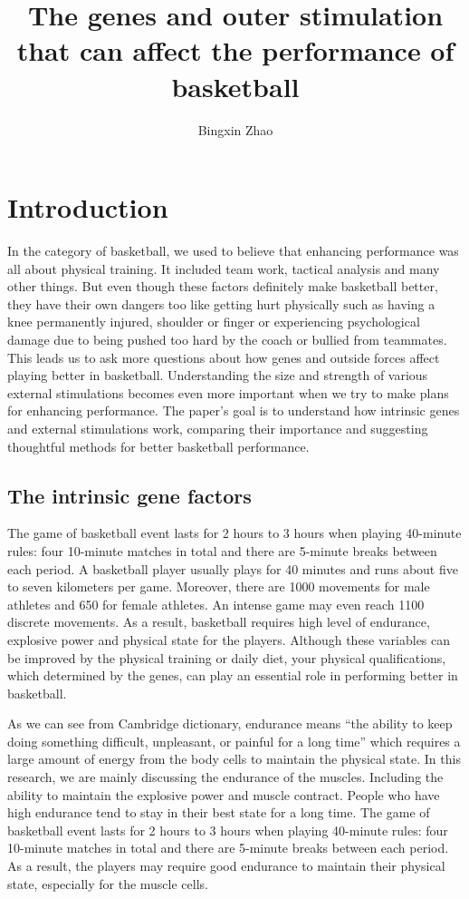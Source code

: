 \documentclass[man,floatsintext]{apa7}
\title{The genes and outer stimulation that can affect the performance of basketball}
\author{Bingxin Zhao}
\affiliation{}
\begin{document}
\maketitle
\tableofcontents
\newpage


\section{Introduction}


In the category of basketball, we used to believe that enhancing performance was all about physical training. It included team work, tactical analysis and many other things. But even though these factors definitely make basketball better, they have their own dangers too like getting hurt physically such as having a knee permanently injured, shoulder or finger or experiencing psychological damage due to being pushed too hard by the coach or bullied from teammates. This leads us to ask more questions about how genes and outside forces affect playing better in basketball. Understanding the size and strength of various external stimulations becomes even more important when we try to make plans for enhancing performance. The paper's goal is to understand how intrinsic genes and external stimulations work, comparing their importance and suggesting thoughtful methods for better basketball performance. 


\subsection{The intrinsic gene factors}
The game of basketball event lasts for 2 hours to 3 hours when playing 40-minute rules: four 10-minute matches in total and there are 5-minute breaks between each period. A basketball player usually plays for 40 minutes and runs about five to seven kilometers per game. Moreover, there are 1000 movements for male athletes and 650 for female athletes. An intense game may even reach 1100 discrete movements.\autocite[13-14]{raduScienceBasketball2018} As a result, basketball requires high level of endurance, explosive power and physical state for the players. Although these variables can be improved by the physical training or daily diet, your physical qualifications, which determined by the genes, can play an essential role in performing better in basketball.

As we can see from Cambridge dictionary, endurance means ``the ability to keep doing something difficult, unpleasant, or painful for a long time'' which requires a large amount of energy from the body cells to maintain the physical state. In this research, we are mainly discussing the endurance of the muscles. Including the ability to maintain the explosive power and muscle contract. People who have high endurance tend to stay in their best state for a long time. The game of basketball event lasts for 2 hours to 3 hours when playing 40-minute rules: four 10-minute matches in total and there are 5-minute breaks between each period. As a result, the players may require good endurance to maintain their physical state, especially for the muscle cells.
\end{document}
